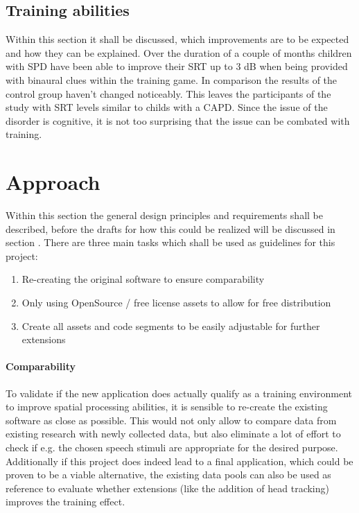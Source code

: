 \documentclass[a4paper,11pt]{article}%
\renewcommand{\\}{\vspace*{0.5\baselineskip} \newline}
\begin{document}
\subsection{Training abilities}
Within this section it shall be discussed, which improvements are to be expected and how they can be explained.
\newline
\newline
Over the duration of a couple of months children with \ac{SPD} have been able to improve their \ac{SRT} up to 3 dB when being provided with binaural clues within the training game. In comparison the results of the control group haven't changed noticeably. This leaves the participants of the study with \ac{SRT} levels similar to childs with a \ac{CAPD}.
\newline
\newline
Since the issue of the disorder is cognitive, it is not too surprising that the issue can be combated with training.


\section{Approach}
\label{sec:approach}
Within this section the general design principles and requirements shall be described, before the drafts for how this could be realized will be discussed in section .
\newline
\newline
There are three main tasks which shall be used as guidelines for this project:
\begin{enumerate}
\item Re-creating the original software to ensure comparability
\item Only using OpenSource / free license assets to allow for free distribution
\item Create all assets and code segments to be easily adjustable for further extensions
\end{enumerate}

\paragraph{Comparability} To validate if the new application does actually qualify as a training environment to improve spatial processing abilities, it is sensible to re-create the existing software as close as possible. This would not only allow to compare data from existing research with newly collected data, but also eliminate a lot of effort to check if e.g. the chosen speech stimuli are appropriate for the desired purpose. Additionally if this project does indeed lead to a final application, which could be proven to be a viable alternative, the existing data pools can also be used as reference to evaluate whether extensions (like the addition of head tracking) improves the training effect.
\end{document}
